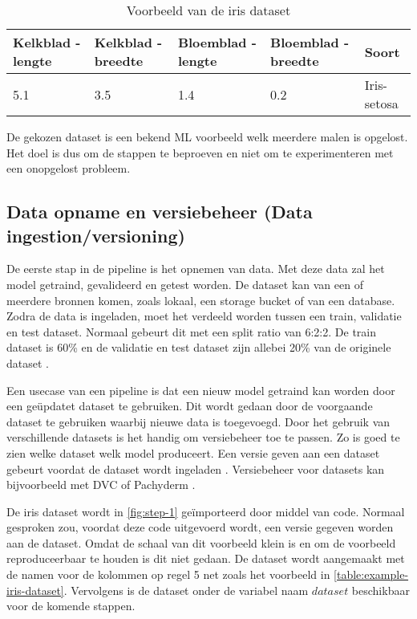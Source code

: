 \begin{table}[hbt!]
  \footnotesize
  \centering
  \begin{tabular}{|l|l|l|l|l|}
  \hline
  \textbf{Kelkblad - lengte} & \textbf{Kelkblad - breedte} & \textbf{Bloemblad - lengte} & \textbf{Bloemblad - breedte} & \textbf{Soort} \\ \hline
  5.1 & 3.5 & 1.4 & 0.2 & Iris-setosa\\ \hline
  \end{tabular}
  \caption{Voorbeeld van de iris dataset}
  \label{table:example-iris-dataset}
\end{table}

De gekozen dataset is een bekend ML voorbeeld welk meerdere malen is opgelost. Het doel is dus om de stappen te beproeven en niet om te experimenteren met een onopgelost probleem.

\subsection{Data opname en versiebeheer (Data ingestion/versioning)}\label{subsec:data-opname-en-versiebeheer}
De eerste stap in de pipeline is het opnemen van data. Met deze data zal het model getraind, gevalideerd en getest worden. De dataset kan van een of meerdere bronnen komen, zoals lokaal, een storage bucket of van een database. Zodra de data is ingeladen, moet het verdeeld worden tussen een train, validatie en test dataset. Normaal gebeurt dit met een split ratio van 6:2:2. De train dataset is 60\% en de validatie en test dataset zijn allebei 20\% van de originele dataset \cite[p.~27-37]{building-machine-learning-pipelines-oreilly}.

Een usecase van een pipeline is dat een nieuw model getraind kan worden door een geüpdatet dataset te gebruiken. Dit wordt gedaan door de voorgaande dataset te gebruiken waarbij nieuwe data is toegevoegd. Door het gebruik van verschillende datasets is het handig om versiebeheer toe te passen. Zo is goed te zien welke dataset welk model produceert. Een versie geven aan een dataset gebeurt voordat de dataset wordt ingeladen \cite[p.~39-40]{building-machine-learning-pipelines-oreilly}. Versiebeheer voor datasets kan bijvoorbeeld met DVC \cite{dvc} of Pachyderm \cite{pachyderm}.

De iris dataset wordt in \autoref{fig:step-1} geïmporteerd door middel van code. Normaal gesproken zou, voordat deze code uitgevoerd wordt, een versie gegeven worden aan de dataset. Omdat de schaal van dit voorbeeld klein is en om de voorbeeld reproduceerbaar te houden is dit niet gedaan. De dataset wordt aangemaakt met de namen voor de kolommen op regel 5 net zoals het voorbeeld in \autoref{table:example-iris-dataset}. Vervolgens is de dataset onder de variabel naam \(dataset\) beschikbaar voor de komende stappen.

